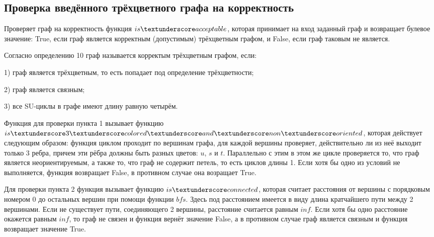 	\subsection{Проверка введённого трёхцветного графа на корректность}
	\hspace{0.5 cm} Проверяет граф на корректность функция $is\textunderscore acceptable$, которая принимает на вход заданный граф и возвращает булевое значение: True, если граф является корректным (допустимым) трёхцветным графом, и False, если граф таковым не является.
	\par Согласно определению 10 граф называется корректым трёхцветным графом, если:
	\par 1) граф является трёхцветным, то есть попадает под определение трёхцветности;
	\par 2) граф является связным;
	\par 3) все SU-циклы в графе имеют длину равную четырём.
	\par Функция для проверки пункта 1 вызывает функцию $is \textunderscore 3 \textunderscore colored \textunderscore and \textunderscore non \textunderscore oriented$, которая действует следующим образом: функция циклом проходит по вершинам графа, для каждой вершины проверяет, действительно ли из неё выходит только 3 ребра, причем эти рёбра должны быть разных цветов: $u$, $s$ и $t$. Параллельно с этим в этом же цикле проверяется то, что граф является неориентируемым, а также то, что граф не содержит петель, то есть циклов длины 1. Если хотя бы одно из условий не выполняется, функция возвращает False, в противном случае она возращает True.
	\par Для проверки пункта 2 функция вызывает функцию $is \textunderscore connected$, которая считает расстояния от вершины с порядковым номером 0 до остальных вершин при помощи функции $bfs$. Здесь под расстоянием имеется в виду длина кратчайшего пути между 2 вершинами. Если не существует пути, соединяющего 2 вершины, расстояние считается равным $inf$. Если хотя бы одно расстояние окажется равным $inf$, то граф не связен и функция вернёт значение False, а в противном случае граф является связным и функция возвращает значение True.

